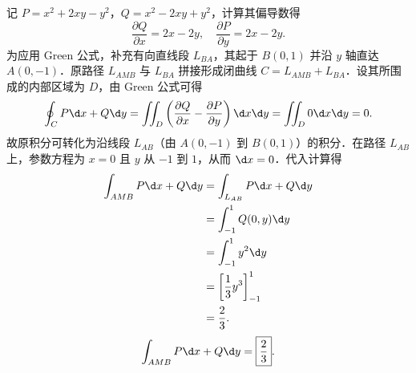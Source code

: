 \begin{solution}

    记 $P = x^2+2xy-y^2$，$Q = x^2-2xy+y^2$，计算其偏导数得
    \begin{equation}
        \frac{\partial Q}{\partial x} = 2x-2y, \quad \frac{\partial P}{\partial y} = 2x-2y.
    \end{equation}
    为应用 Green 公式，补充有向直线段 $L_{BA}$，其起于 $B(0,1)$ 并沿 $y$ 轴直达 $A(0,-1)$．原路径 $L_{AMB}$ 与 $L_{BA}$ 拼接形成闭曲线 $C = L_{AMB} + L_{BA}$．设其所围成的内部区域为 $D$，由 Green 公式可得
    \begin{equation}
        \oint_C P \d x + Q \d y = \iint_D \left( \frac{\partial Q}{\partial x} - \frac{\partial P}{\partial y} \right) \d x \d y = \iint_D 0 \d x \d y = 0.
    \end{equation}
    故原积分可转化为沿线段 $L_{AB}$（由 $A(0,-1)$ 到 $B(0,1)$）的积分．在路径 $L_{AB}$ 上，参数方程为 $x=0$ 且 $y$ 从 $-1$ 到 $1$，从而 $\d x = 0$．代入计算得
    \begin{equation}
        \begin{aligned}
            \int_{AMB} P \d x + Q \d y & = \int_{L_{AB}} P \d x + Q \d y        \\
                                       & = \int_{-1}^1 Q(0,y) \d y              \\
                                       & = \int_{-1}^1 y^2 \d y                 \\
                                       & = \left[ \frac{1}{3}y^3 \right]_{-1}^1 \\
                                       & = \frac{2}{3}.
        \end{aligned}
    \end{equation}
    \begin{equation}
        \int_{AMB} P \d x + Q \d y = \boxed{\frac{2}{3}}.
    \end{equation}



\end{solution}
